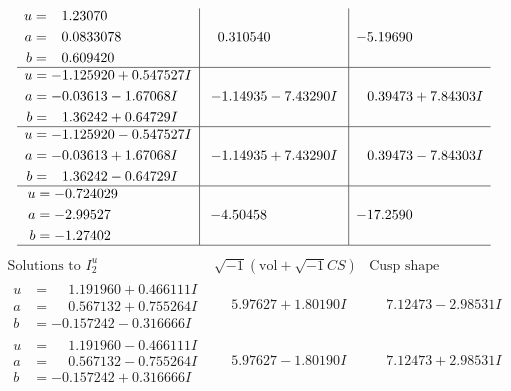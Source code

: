 \documentclass[1p]{elsarticle_modified}
\theoremstyle{definition}
\newcommand{\I}{\sqrt{-1}}
\begin{document}
$$\begin{array}{c|c|c}
\begin{aligned}
u &= \phantom{-}1.23070\phantom{ +0.000000I} \\
a &= \phantom{-}0.0833078\phantom{ +0.000000I} \\
b &= \phantom{-}0.609420\phantom{ +0.000000I}\end{aligned}
 & \phantom{-}0.310540\phantom{ +0.000000I} & -5.19690\phantom{ +0.000000I} \\ \hline\begin{aligned}
u &= -1.125920 + 0.547527 I \\
a &= -0.03613 - 1.67068 I \\
b &= \phantom{-}1.36242 + 0.64729 I\end{aligned}
 & -1.14935 - 7.43290 I & \phantom{-}0.39473 + 7.84303 I \\ \hline\begin{aligned}
u &= -1.125920 - 0.547527 I \\
a &= -0.03613 + 1.67068 I \\
b &= \phantom{-}1.36242 - 0.64729 I\end{aligned}
 & -1.14935 + 7.43290 I & \phantom{-}0.39473 - 7.84303 I \\ \hline\begin{aligned}
u &= -0.724029\phantom{ +0.000000I} \\
a &= -2.99527\phantom{ +0.000000I} \\
b &= -1.27402\phantom{ +0.000000I}\end{aligned}
 & -4.50458\phantom{ +0.000000I} & -17.2590\phantom{ +0.000000I}\\
 \hline 
 \end{array}$$\newpage$$\begin{array}{c|c|c}  
\text{Solutions to }I^u_{2}& \I (\text{vol} + \sqrt{-1}CS) & \text{Cusp shape}\\
 \hline 
\begin{aligned}
u &= \phantom{-}1.191960 + 0.466111 I \\
a &= \phantom{-}0.567132 + 0.755264 I \\
b &= -0.157242 - 0.316666 I\end{aligned}
 & \phantom{-}5.97627 + 1.80190 I & \phantom{-}7.12473 - 2.98531 I \\ \hline\begin{aligned}
u &= \phantom{-}1.191960 - 0.466111 I \\
a &= \phantom{-}0.567132 - 0.755264 I \\
b &= -0.157242 + 0.316666 I\end{aligned}
 & \phantom{-}5.97627 - 1.80190 I & \phantom{-}7.12473 + 2.98531 I \\ \hline\begin{aligned}

\end{aligned}
\end{array}$$
\end{document}
